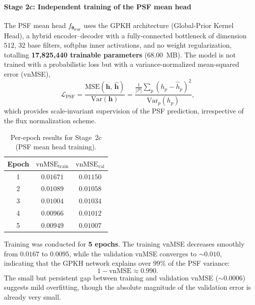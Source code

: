 \documentclass{aa}
\begin{document}
\paragraph{Stage 2c: Independent training of the PSF mean head}

The PSF mean head $f_{\boldsymbol{\theta}_\mathrm{PSF}}$ uses the GPKH architecture (Global-Prior Kernel Head), a hybrid encoder--decoder with a fully-connected bottleneck of dimension $512$, 32 base filters, softplus inner activations, and no weight regularization, totalling \textbf{17,825,440 trainable parameters} (68.00~MB). The model is not trained with a probabilistic loss but with a variance-normalized mean-squared error (vnMSE),
\begin{equation}
\mathcal{L}_\mathrm{PSF}
=
\frac{\mathrm{MSE}(\mathbf{h},\, \hat{\mathbf{h}})}{\mathrm{Var}(\mathbf{h})}
=
\frac{\frac{1}{|\mathcal{P}|}\sum_p (h_p - \hat{h}_p)^2}{\mathrm{Var}_p(h_p)},
\end{equation}
which provides scale-invariant supervision of the PSF prediction, irrespective of the flux normalization scheme.

\begin{table}[h]
\centering
\begin{tabular}{|c|c|c|}
\hline
\textbf{Epoch} & $\mathrm{vnMSE}_\mathrm{train}$ & $\mathrm{vnMSE}_\mathrm{val}$ \\
\hline
1 & $0.01671$ & $0.01150$ \\
2 & $0.01089$ & $0.01058$ \\
3 & $0.01004$ & $0.01034$ \\
4 & $0.00966$ & $0.01012$ \\
5 & $\mathbf{0.00949}$ & $\mathbf{0.01007}$ \\
\hline
\end{tabular}
\caption{Per-epoch results for Stage~2c (PSF mean head training).}
\label{tab:step2c}
\end{table}

Training was conducted for \textbf{5 epochs}. The training vnMSE decreases smoothly from $0.0167$ to $0.0095$, while the validation vnMSE converges to $\sim 0.010$, indicating that the GPKH network explains over $99\%$ of the PSF variance:
\begin{equation}
1 - \mathrm{vnMSE} \approx 0.990.
\end{equation}
The small but persistent gap between training and validation vnMSE ($\sim 0.0006$) suggests mild overfitting, though the absolute magnitude of the validation error is already very small.
\end{document}
